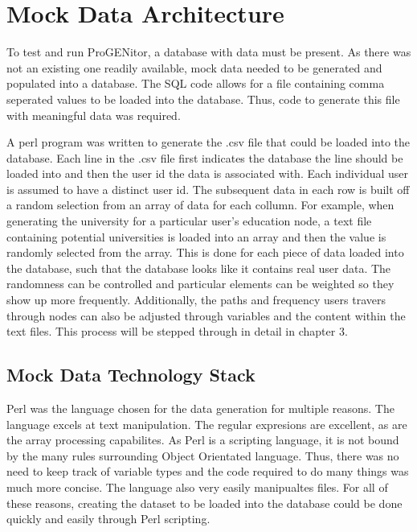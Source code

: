 \section{Mock Data Architecture}
	To test and run ProGENitor, a database with data must be present.  As there was
not an existing one readily available, mock data needed to be generated and
populated into a database.  The SQL code allows for a file containing comma
seperated values to be loaded into the database.  Thus, code to generate this
file with meaningful data was required.  
	
A perl program was written to generate the .csv file that could be loaded into
the database.  Each line in the .csv file first indicates the database the line
should be loaded into and then the user id the data is associated with.  Each
individual user is assumed to have a distinct user id.  The subsequent data in
each row is built off a random selection from an array of data for each collumn.
For example, when generating the university for a particular user's education
node, a text file containing potential universities is loaded into an array and
then the value is randomly selected from the array.  This is done for each piece
of data loaded into the database, such that the database looks like it contains
real user data.  The randomness can be controlled and particular elements can be
weighted so they show up more frequently.  Additionally, the paths and
frequency users travers through nodes can also be adjusted through variables and
the content within the text files.  This process will be stepped through in
detail in chapter 3.

\subsection{Mock Data Technology Stack}
Perl was the language chosen for the data generation for multiple reasons.  The
language excels at text manipulation.  The regular expresions are excellent, as
are the array processing capabilites.  As Perl is a scripting language, it is
not bound by the many rules surrounding Object Orientated language.  Thus,
there was no need to keep track of variable types and the code required to do
many things was much more concise.  The language also very easily manipualtes
files.  For all of these reasons, creating the dataset to be loaded into the
database could be done quickly and easily through Perl scripting.
